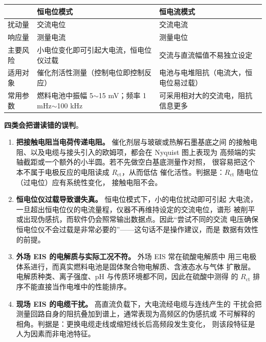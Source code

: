 \begin{center}
\small
\begin{tabularx}{\onecolwidth}{@{}>{\raggedright\arraybackslash}p{26mm}
  >{\raggedright\arraybackslash}X >{\raggedright\arraybackslash}X@{}}
\toprule
 & 恒电位模式 & 恒电流模式 \\
\midrule
扰动量 & 交流电位 & 交流电流 \\
响应量 & 测量电流 & 测量电位 \\
主要风险 & 小电位变化即可引起大电流，恒电位仪过载 &
            交流与直流幅值不易独立设定 \\
适用对象 & 催化剂活性测量（控制电位即控制反应） &
            电池与电堆阻抗（电流大，恒电位易过载） \\
常用参数 & 燃料电池中振幅 5$\sim$15 mV；频率 1 mHz$\sim$100 kHz &
            可采用相对大的交流电，阻抗信息更多 \\
\bottomrule
\end{tabularx}
\end{center}

\begin{pitfall}
\textbf{四类会把谱读错的误判}。

\begin{enumerate}
  \item \textbf{把接触电阻当电荷传递电阻。} 催化剂层与玻碳或热解石墨基底之间
        的接触电阻、以及电缆与接头引入的欧姆项，都会在 Nyquist 图上表现为
        高频端的实轴截距或一个额外的小半圆。若不先做空白基底测量作对照，
        很容易把这个本不属于电极反应的电阻读成 $R_\mathrm{ct}$，从而低估
        催化活性。判据是：$R_\mathrm{ct}$ 随电位（过电位）应有系统性变化，
        接触电阻不会。
  \item \textbf{恒电位仪过载导致谱失真。} 恒电位模式下，小的电位扰动即可引起
        大电流，一旦超出恒电位仪的电流量程，仪器不再维持设定的交流电位，谱形
        被削平或出现伪感抗，而软件仍会照常输出数据点。因此“尝试不同的交流
        电压确保恒电位仪不会过载是非常必要的”——这句话不是操作建议，而是
        数据有效性的前提。
  \item \textbf{外场 EIS 的电解质与实际工况不符。} 外场 EIS 常在硫酸电解质中
        用三电极体系进行，而真实燃料电池是固体聚合物电解质、含液态水与气体
        扩散层。电解质种类、离子强度、pH 与传质环境都不同，因此在硫酸中测得
        的 $R_\mathrm{ct}$ 排序不能直接当作电堆中的性能排序。
  \item \textbf{现场 EIS 的电缆干扰。} 高直流负载下，大电流经电缆与连线产生的
        干扰会把测量回路自身的阻抗叠加到谱上，通常表现为高频区的伪感抗或
        不可解释的相角。判据是：更换电缆走线或缩短线长后高频段发生变化，
        则该段特征是人为因素而非电池特征。
\end{enumerate}
\end{pitfall}

